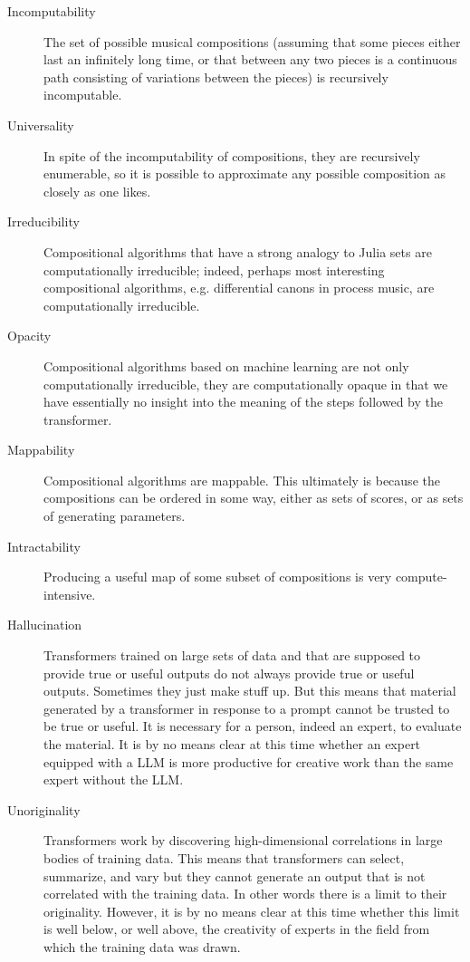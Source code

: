\documentclass[11pt]{amsart}
\begin{document}
\begin{description}
\item[Incomputability] The set of possible musical compositions (assuming that some pieces either last an infinitely long time, or that between any two pieces is a continuous path consisting of variations between the pieces) is recursively incomputable.
\item[Universality] In spite of the incomputability of compositions, they are recursively enumerable, so it is possible to approximate any possible composition as closely as one likes.
\item[Irreducibility] Compositional algorithms that have a strong analogy to Julia sets are computationally irreducible; indeed, perhaps most interesting compositional algorithms, e.g. differential canons in process music, are computationally irreducible.
\item[Opacity] Compositional algorithms based on machine learning are not only computationally irreducible, they are computationally opaque in that we have essentially no insight into the meaning of the steps followed by the transformer.
\item[Mappability] Compositional algorithms are mappable. This ultimately is because the compositions can be ordered in some way, either as sets of scores, or as sets of generating parameters.
\item[Intractability] Producing a useful map of some subset of compositions is very compute-intensive. 
\item[Hallucination] Transformers trained on large sets of data and that are supposed to provide true or useful outputs do not always provide true or useful outputs. Sometimes they just make stuff up. But this means that material generated by a transformer in response to a prompt cannot be trusted to be true or useful. It is necessary for a person, indeed an expert, to evaluate the material. It is by no means clear at this time whether an expert equipped with a LLM is more productive for creative work than the same expert without the LLM.
\item[Unoriginality] Transformers work by discovering high-dimensional correlations in large bodies of training data. This means that transformers can select, summarize, and vary but they cannot generate an output that is not correlated with the training data. In other words there is a limit to their originality. However, it is by no means clear at this time whether this limit is well below, or well above, the creativity of experts in the field from which the training data was drawn.
\end{description}
\end{document}
